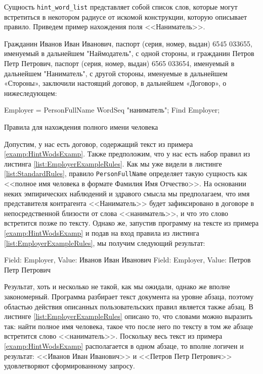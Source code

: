 Сущность \lstinline{hint_word_list} представляет собой список слов, которые могут встретиться в некотором радиусе от искомой конструкции, которую описывает правило. Приведем пример нахождения поля <<Наниматель>>.
\begin{myexample}
\label{examp:HintWodsExamp}
Гражданин Иванов Иван Иванович, паспорт (серия, номер, выдан) 6545 033655, именуемый в дальнейшем "Наймодатель", с одной стороны, и гражданин Петров Петр Петрович, паспорт (серия, номер, выдан) 6565 033654, именуемый в дальнейшем "Наниматель", с другой стороны, именуемые в дальнейшем «Стороны», заключили настоящий договор, в дальнейшем «Договор», о нижеследующем:
\end{myexample}
\begin{ListingEnv}
\begin{Verb}
Employer = PersonFullName WordSeq "наниматель";
Find Employer;
\end{Verb}
\label{list:EmployerExampleRules}
\caption{Правила для нахождения полного имени человека}
\end{ListingEnv}

Допустим, у нас есть договор, содержащий текст из примера \ref{examp:HintWodsExamp}. Также предположим, что у нас есть набор правил из листинга \ref{list:EmployerExampleRules}. Как мы уже видели в листинге \ref{list:StandardRules}, правило \lstinline{PersonFullName} определяет такую сущность как <<полное имя человека в формате Фамилия Имя Отчество>>. На основании неких эмпирических наблюдений и здравого смысла мы предполагаем, что имя представителя контрагента <<Наниматель>> будет зафиксировано в договоре в непосредственной близости от слова <<наниматель>>, и что это слово встретится позже по тексту. Однако же, запустив программу на тексте из примера \ref{examp:HintWodsExamp} и подав на вход правила из листинга \ref{list:EmployerExampleRules}, мы получим следующий результат:
\begin{Verb}
Field: Employer, Value: Иванов Иван Иванович
Field: Employer, Value: Петров Петр Петрович
\end{Verb}
Результат, хоть и несколько не такой, как мы ожидали, однако же вполне закономерный. Программа разбирает текст документа на уровне абзаца, поэтому областью действия описанных пользовательских правил является также абзац. В листинге \ref{list:EmployerExampleRules} описано то, что словами можно выразить так: найти полное имя человека, такое что после него по тексту в том же абзаце встретится слово <<наниматель>>. Поскольку весь текст из примера \ref{examp:HintWodsExamp} располагается в одном абзаце, то вполне логичен и результат: <<Иванов Иван Иванович>> и <<Петров Петр Петрович>> удовлетворяют сформированному запросу.

